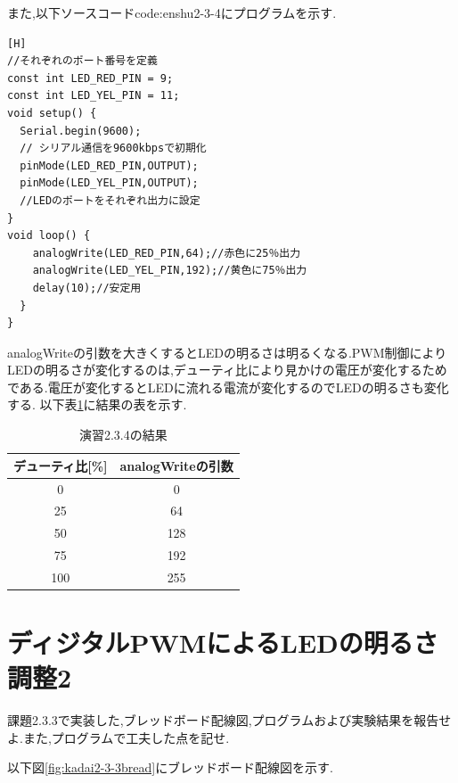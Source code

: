 \documentclass{jarticle}
\begin{document}
また,以下ソースコード{code:enshu2-3-4}にプログラムを示す.

\begin{lstlisting}[caption = 演習2.3.4,label=code:enshu2-3-4][H]
//それぞれのポート番号を定義
const int LED_RED_PIN = 9; 
const int LED_YEL_PIN = 11;
void setup() {
  Serial.begin(9600);
  // シリアル通信を9600kbpsで初期化
  pinMode(LED_RED_PIN,OUTPUT);
  pinMode(LED_YEL_PIN,OUTPUT);
  //LEDのポートをそれぞれ出力に設定
}
void loop() {
    analogWrite(LED_RED_PIN,64);//赤色に25％出力
    analogWrite(LED_YEL_PIN,192);//黄色に75％出力
    delay(10);//安定用
  }
}
\end{lstlisting}

analogWriteの引数を大きくするとLEDの明るさは明るくなる.PWM制御によりLEDの明るさが変化するのは,デューティ比により見かけの電圧が変化するためである.電圧が変化するとLEDに流れる電流が変化するのでLEDの明るさも変化する.
以下表\ref{table:enshu2-3-4}に結果の表を示す.

\begin{table}[H]
\centering
\caption{演習2.3.4の結果}
\label{table:enshu2-3-4}
\begin{center}
\begin{tabular}{c|c}
\hline \hline
デューティ比[\%] & analogWriteの引数\\ \hline
0 & 0  \\
25 & 64 \\
50 & 128 \\
75 & 192 \\ 
100 & 255 \\ \hline
\end{tabular}
\end{center}
\end{table}

\section{ディジタルPWMによるLEDの明るさ調整2}

課題2.3.3で実装した,ブレッドボード配線図,プログラムおよび実験結果を報告せよ.また,プログラムで工夫した点を記せ.


以下図\ref{fig:kadai2-3-3bread}にブレッドボード配線図を示す.
\end{document}
